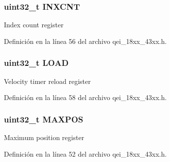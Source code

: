 \subsubsection[{\texorpdfstring{I\+N\+X\+C\+NT}{INXCNT}}]{ uint32\+\_\+t I\+N\+X\+C\+NT}\hypertarget{struct_l_p_c___q_e_i___t_a586b72a615b09965fd5e590f234d87bd}{}\label{struct_l_p_c___q_e_i___t_a586b72a615b09965fd5e590f234d87bd}
Index count register 

Definición en la línea 56 del archivo qei\+\_\+18xx\+\_\+43xx.\+h.

\subsubsection[{\texorpdfstring{L\+O\+AD}{LOAD}}]{ uint32\+\_\+t L\+O\+AD}\hypertarget{struct_l_p_c___q_e_i___t_aad9adf4efc940cddb8161b69cfbe19d3}{}\label{struct_l_p_c___q_e_i___t_aad9adf4efc940cddb8161b69cfbe19d3}
Velocity timer reload register 

Definición en la línea 58 del archivo qei\+\_\+18xx\+\_\+43xx.\+h.

\subsubsection[{\texorpdfstring{M\+A\+X\+P\+OS}{MAXPOS}}]{ uint32\+\_\+t M\+A\+X\+P\+OS}\hypertarget{struct_l_p_c___q_e_i___t_aeca182188d6e2da43879cfe82e4fd438}{}\label{struct_l_p_c___q_e_i___t_aeca182188d6e2da43879cfe82e4fd438}
Maximum position register 

Definición en la línea 52 del archivo qei\+\_\+18xx\+\_\+43xx.\+h.

